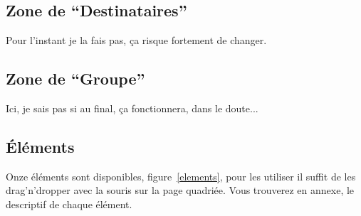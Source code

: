 \documentclass[a4paper,11pt,final]{report}
\begin{document}
\subsection{Zone de ``Destinataires''}
Pour l'instant je la fais pas, ça risque fortement de changer.

\subsection{Zone de ``Groupe''}
Ici, je sais pas si au final, ça fonctionnera, dans le doute...

\subsection{Éléments}
Onze éléments sont disponibles, figure~\ref{elements}, pour les utiliser il suffit de les drag'n'dropper avec la souris sur la page quadriée. Vous trouverez en annexe, le descriptif de chaque élément.

\noindent\begin{minipage}{\linewidth}%
\label{elements}
\end{minipage}

\end{document}
